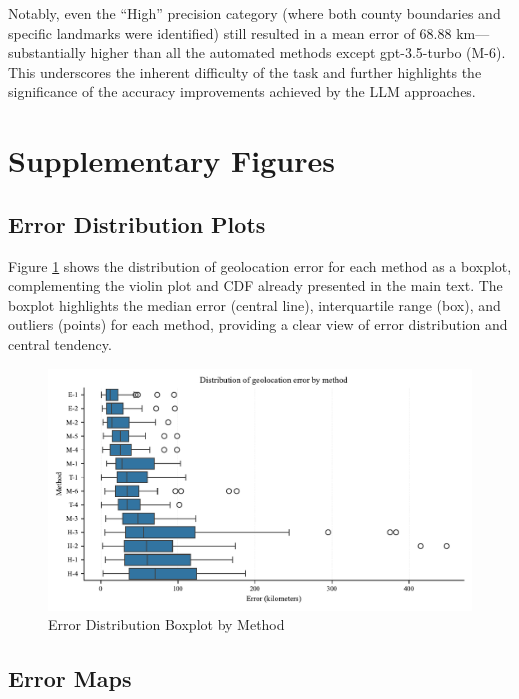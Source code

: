 Notably, even the ``High'' precision category (where both county
boundaries and specific landmarks were identified) still resulted in a
mean error of 68.88 km---substantially higher than all the automated
methods except gpt-3.5-turbo (M-6). This underscores the inherent
difficulty of the task and further highlights the significance of the
accuracy improvements achieved by the LLM approaches.

\section{Supplementary
Figures}\label{appendix-c-supplementary-figures}

\subsection{Error Distribution
Plots}\label{c.1-error-distribution-plots}

Figure \ref{fig:error_boxplot} shows the distribution of geolocation
error for each method as a boxplot, complementing the violin plot and
CDF already presented in the main text. The boxplot highlights the
median error (central line), interquartile range (box), and outliers
(points) for each method, providing a clear view of error distribution
and central tendency.

\begin{figure}
\centering
\includegraphics[width=\textwidth,height=0.8\textheight,keepaspectratio]{figures/error_boxplot.pdf}
\caption{Error Distribution Boxplot by Method}\label{fig:error_boxplot}
\end{figure}

\subsection{Error Maps}\label{c.2-error-maps}

